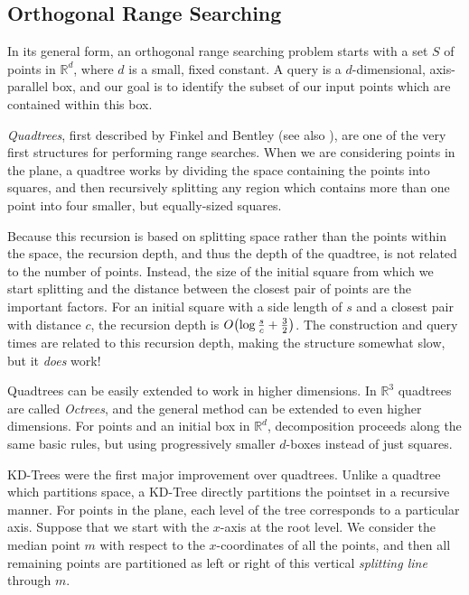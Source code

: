 \subsection*{Orthogonal Range Searching} 

In its general form, an orthogonal range searching problem starts with a set $S$ of points in $\mathbb{R}^d$, where $d$ is a small, fixed constant.
A query is a $d$-dimensional, axis-parallel box, and our goal is to identify the subset of our input points which are contained within this box.

\emph{Quadtrees}, first described by Finkel and Bentley\cite{Finkel74} (see also \cite{debergch14}), are one of the very first structures for performing range searches.
When we are considering points in the plane, a quadtree works by dividing the space containing the points into squares, and then recursively splitting any region which contains more than one point into four smaller, but equally-sized squares.

Because this recursion is based on splitting space rather than the points within the space, the recursion depth, and thus the depth of the quadtree, is not related to the number of points. 
Instead, the size of the initial square from which we start splitting and the distance between the closest pair of points are the important factors.
For an initial square with a side length of $s$ and a closest pair with distance $c$, the recursion depth is $O\!\left(\log{\frac{s}{c}} + \frac{3}{2}\right)$.
The construction and query times are related to this recursion depth, making the structure somewhat slow, but it \emph{does} work!

Quadtrees can be easily extended to work in higher dimensions. 
In $\mathbb{R}^3$ quadtrees are called \emph{Octrees}, and the general method can be extended to even higher dimensions. 
For points and an initial box in $\mathbb{R}^d$, decomposition proceeds along the same basic rules, but using progressively smaller $d$-boxes instead of just squares.


KD-Trees\cite{Bentley75} were the first major improvement over quadtrees.
Unlike a quadtree which partitions space, a KD-Tree directly partitions the pointset in a recursive manner.
For points in the plane, each level of the tree corresponds to a particular axis.
Suppose that we start with the $x$-axis at the root level.
We consider the median point $m$ with respect to the $x$-coordinates of all the points, and then all remaining points are partitioned as left or right of this vertical \emph{splitting line} through $m$.

